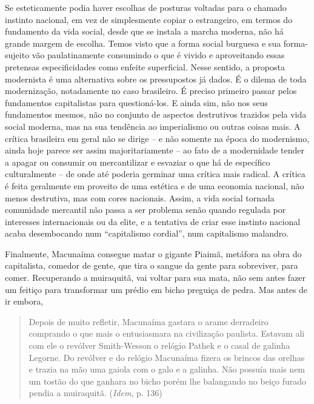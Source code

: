 Se esteticamente podia haver escolhas de posturas voltadas para o
chamado instinto nacional, em vez de simplesmente copiar o estrangeiro,
em termos do fundamento da vida social, desde que se instala a marcha
moderna, não há grande margem de escolha. Temos visto que a forma social
burguesa e sua forma-sujeito vão paulatinamente consumindo o que é
vivido e aproveitando essas pretensas especificidades como enfeite
superficial. Nesse sentido, a proposta modernista é uma alternativa
sobre os pressupostos já dados. É o dilema de toda modernização,
notadamente no caso brasileiro. É preciso primeiro passar pelos
fundamentos capitalistas para questioná-los. E ainda sim, não nos seus
fundamentos mesmos, não no conjunto de aspectos destrutivos trazidos
pela vida social moderna, mas na sua tendência ao imperialismo ou outras
coisas mais. A crítica brasileira em geral não se dirige -- e não
somente na época do modernismo, ainda hoje parece ser assim
majoritariamente -- ao fato de a modernidade tender a apagar ou consumir
ou mercantilizar e esvaziar o que há de específico culturalmente -- de
onde até poderia germinar uma crítica mais radical. A crítica é feita
geralmente em proveito de uma estética e de uma economia nacional, não
menos destrutiva, mas com cores nacionais. Assim, a vida social tornada
comunidade mercantil não passa a ser problema senão quando regulada por
interesses internacionais ou da elite, e a tentativa de criar esse
instinto nacional acaba desembocando num ``capitalismo cordial'', num
capitalismo malandro.

Finalmente, Macunaíma consegue matar o gigante Piaimã, metáfora na obra
do capitalista, comedor de gente, que tira o sangue da gente para
sobreviver, para comer. Recuperando a muiraquitã, vai voltar para sua
mata, não sem antes fazer um feitiço para transformar um prédio em bicho
preguiça de pedra. Mas antes de ir embora,

\begin{quote}
Depois de muito refletir, Macunaíma gastara o arame derradeiro comprando
o que mais o entusiasmara na civilização paulista. Estavam ali com ele o
revólver Smith-Wesson o relógio Pathek e o casal de galinha Legorne. Do
revólver e do relógio Macunaíma fizera os brincos das orelhas e trazia
na mão uma gaiola com o galo e a galinha. Não possuía mais nem um tostão
do que ganhara no bicho porém lhe balangando no beiço furado pendia a
muiraquitã. (\emph{Idem}, p. 136)
\end{quote}

